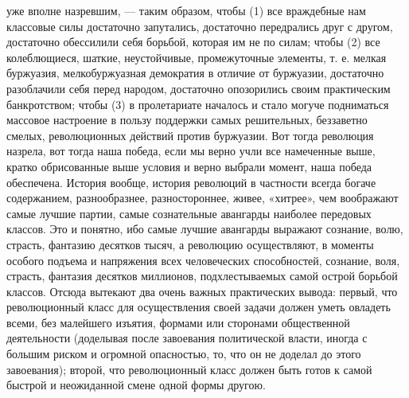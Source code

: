 \documentclass[12pt]{article}
\newcommand{\parnum}{(\arabic{parcount})}
\newcounter{parcount}
\newenvironment{parnumbers}{%
  \par%
  \everypar{\noindent \stepcounter{parcount}\marginpar[]{\parnum}}%
}{}
\begin{document}
\begin{parnumbers}
уже вполне назревшим, — таким образом, чтобы (1) все враждебные нам классовые силы достаточно запутались, достаточно передрались друг с другом, достаточно обессилили себя борьбой, которая им не по силам; чтобы (2) все колеблющиеся, шаткие, неустойчивые, промежуточные элементы, т. е. мелкая буржуазия, мелкобуржуазная демократия в отличие от буржуазии, достаточно разоблачили себя перед народом, достаточно опозорились своим практическим банкротством; чтобы (3) в пролетариате началось и стало могуче подниматься массовое настроение в пользу поддержки самых решительных, беззаветно смелых, революционных действий против буржуазии. Вот тогда революция назрела, вот тогда наша победа, если мы верно учли все намеченные выше, кратко обрисованные выше условия и верно выбрали момент, наша победа обеспечена. История вообще, история революций в частности всегда богаче содержанием, разнообразнее, разностороннее, живее, «хитрее», чем воображают самые лучшие партии, самые сознательные авангарды наиболее передовых классов. Это и понятно, ибо самые лучшие авангарды выражают сознание, волю, страсть, фантазию десятков тысяч, а революцию осуществляют, в моменты особого подъема и напряжения всех человеческих способностей, сознание, воля, страсть, фантазия десятков миллионов, подхлестываемых самой острой борьбой классов. Отсюда вытекают два очень важных практических вывода: первый, что революционный класс для осуществления своей задачи должен уметь овладеть всеми, без малейшего изъятия, формами или сторонами общественной деятельности (доделывая после завоевания политической власти, иногда с большим риском и огромной опасностью, то, что он не доделал до этого завоевания); второй, что революционный класс должен быть готов к самой быстрой и неожиданной смене одной формы другою.


\end{parnumbers}
\end{document}
